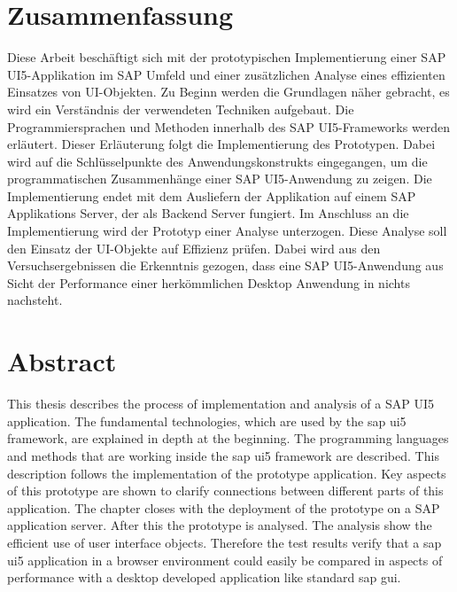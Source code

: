 \section*{Zusammenfassung}
Diese Arbeit beschäftigt sich mit der prototypischen Implementierung einer SAP UI5-Applikation im SAP Umfeld und einer zusätzlichen Analyse eines effizienten Einsatzes von UI-Objekten. Zu Beginn werden die Grundlagen näher gebracht, es wird ein Verständnis der verwendeten Techniken aufgebaut. Die Programmiersprachen und Methoden innerhalb des SAP UI5-Frameworks werden erläutert. Dieser Erläuterung folgt die Implementierung des Prototypen. Dabei wird auf die Schlüsselpunkte des Anwendungskonstrukts eingegangen, um die programmatischen Zusammenhänge einer SAP UI5-Anwendung zu zeigen. Die Implementierung endet mit dem Ausliefern der Applikation auf einem SAP Applikations Server, der als Backend Server fungiert. Im Anschluss an die Implementierung wird der Prototyp einer Analyse unterzogen. Diese Analyse soll den Einsatz der UI-Objekte auf Effizienz prüfen. Dabei wird aus den Versuchsergebnissen die Erkenntnis gezogen, dass eine SAP UI5-Anwendung aus Sicht der Performance einer herkömmlichen Desktop Anwendung in nichts nachsteht.


%


\section*{Abstract}
This thesis describes the process of implementation and analysis of a SAP UI5 application. The fundamental technologies, which are used by the sap ui5 framework, are explained in depth at the beginning. The programming languages and methods that are working inside the sap ui5 framework are described. This description follows the implementation of the prototype application. Key aspects of this prototype are shown to clarify connections between different parts of this application. The chapter closes with the deployment of the prototype on a SAP application server. After this the prototype is analysed. The analysis show the efficient use of user interface objects. Therefore the test results verify that a sap ui5 application in a browser environment could easily be compared in aspects of performance with a desktop developed application like standard sap gui.
